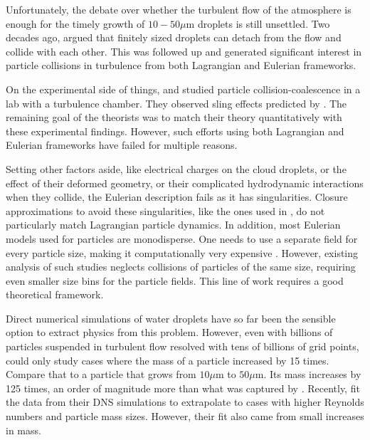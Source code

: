 \documentclass[../Rajarshi-thesis-draft.tex]{subfiles}
\begin{document}
Unfortunately, the debate over whether the turbulent flow of the atmosphere is enough for the timely growth of $10-50\mu$m droplets is still unsettled. Two decades ago, \citet{falkovich2002} argued that finitely sized droplets can detach from the flow and collide with each other. This was followed up \cite{shaw2003,wilkinson2006,falkovich2007} and generated significant interest in particle collisions in turbulence from both Lagrangian and Eulerian frameworks.

On the experimental side of things, \citet{toschi2009} and \citet{bewley2013} studied particle collision-coalescence in a lab with a turbulence chamber. They observed sling effects predicted by \cite{falkovich2002,shaw2003,wilkinson2006}. The remaining goal of the theorists was to match their theory quantitatively with these experimental findings. However, such efforts using both Lagrangian and Eulerian frameworks have failed for multiple reasons.

Setting other factors aside, like electrical charges on the cloud droplets, or the effect of their deformed geometry, or their complicated hydrodynamic interactions when they collide, the Eulerian description fails as it has singularities. Closure approximations to avoid these singularities, like the ones used in \citet{kasbaoui2019}, do not particularly match Lagrangian particle dynamics. In addition, most Eulerian models used for particles are monodisperse. One needs to use a separate field for every particle size, making it computationally very expensive \cite{li2017}. However, existing analysis of such studies neglects collisions of particles of the same size, requiring even smaller size bins for the particle fields. This line of work requires a good theoretical framework.

Direct numerical simulations of water droplets have so far been the sensible option to extract physics from this problem. However, even with billions of particles suspended in turbulent flow resolved with tens of billions of grid points, \citet{bec2016} could only study cases where the mass of a particle increased by 15 times. Compare that to a particle that grows from $10\mu$m to $50\mu$m. Its mass increases by 125 times, an order of magnitude more than what was captured by \cite{bec2016}. Recently, \citet{batge2026} fit the data from their DNS simulations to extrapolate to cases with higher Reynolds numbers and particle mass sizes. However, their fit also came from small increases in mass.
\end{document}
